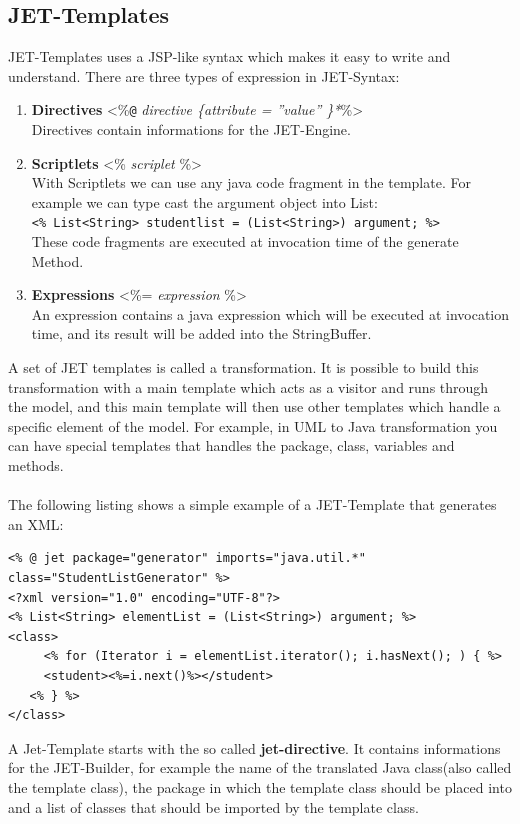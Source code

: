 \subsection{JET-Templates}
JET-Templates uses a JSP-like syntax which makes it easy to write and understand. There are three types of expression in JET-Syntax:
\begin{enumerate}
	\item \textbf{Directives} <\%\verb|@| \textit{directive \{attribute =  ''value''  \}*}\%>\\
	      Directives contain informations for the JET-Engine. 
	      
	\item \textbf{Scriptlets} <\% \textit{scriplet} \%>\\
	      With Scriptlets we can use any java code fragment in the template. 
	      For example we can type cast the argument object into List:\\ 
	      \verb|<% List<String> studentlist = (List<String>) argument; %>|\\
	      These code fragments are executed at invocation time of the generate Method.
	      
	\item \textbf{Expressions} <\%= \textit{expression} \%>\\
	      An expression contains a java expression which will be executed at invocation time, and its result will be added into the StringBuffer.
\end{enumerate}

A set of JET templates is called a transformation. It is possible to build this transformation with a main template which acts as a visitor and runs through the model, and this main template will then use other templates which handle a specific element of the model. For example, in UML to Java transformation you can have special templates that handles the package, class, variables and methods.\\\\
The following listing shows a simple example of a JET-Template that generates an XML:
\begin{lstlisting}[caption = a simple JET-Template]
<% @ jet package="generator" imports="java.util.*" class="StudentListGenerator" %> 
<?xml version="1.0" encoding="UTF-8"?>
<% List<String> elementList = (List<String>) argument; %>
<class>
	 <% for (Iterator i = elementList.iterator(); i.hasNext(); ) { %>
     <student><%=i.next()%></student>
   <% } %>
</class>
\end{lstlisting}
A Jet-Template starts with the so called \textbf{jet-directive}. It contains informations for the JET-Builder, for example the name of the translated Java class(also called the template class), the package in which the template class should be placed into and a list of classes that should be imported by the template class.

